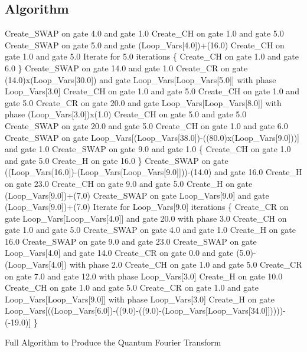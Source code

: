 \subsection{Algorithm}
\label{sec:evoqftalgo}
\begin{algorithm}
 \begin{algorithmic}
\STATE Create\_SWAP on gate 4.0 and gate 1.0
\STATE Create\_CH on gate 1.0 and gate 5.0
\STATE Create\_SWAP on gate 5.0 and gate (Loop\_Vars[4.0])+(16.0)
\STATE Create\_CH on gate 1.0 and gate 5.0
\STATE Iterate for 5.0 iterations \{
\STATE Create\_CH on gate 1.0 and gate 6.0
\STATE \}
\STATE Create\_SWAP on gate 14.0 and gate 1.0
\STATE Create\_CR on gate (14.0)x(Loop\_Vars[30.0]) and gate Loop\_Vars[Loop\_Vars[5.0]] with phase Loop\_Vars[3.0]
\STATE Create\_CH on gate 1.0 and gate 5.0
\STATE Create\_CH on gate 1.0 and gate 5.0
\STATE Create\_CR on gate 20.0 and gate Loop\_Vars[Loop\_Vars[8.0]] with phase (Loop\_Vars[3.0])x(1.0)
\STATE Create\_CH on gate 5.0 and gate 5.0
\STATE Create\_SWAP on gate 20.0 and gate 5.0
\STATE Create\_CH on gate 1.0 and gate 6.0
\STATE Create\_SWAP on gate Loop\_Vars[(Loop\_Vars[38.0])-((80.0)x(Loop\_Vars[9.0]))] and gate 1.0
\STATE Create\_SWAP on gate 9.0 and gate 1.0
\STATE \{
\STATE Create\_CH on gate 1.0 and gate 5.0
\STATE Create\_H on gate 16.0
\STATE \}
\STATE Create\_SWAP on gate ((Loop\_Vars[16.0])-(Loop\_Vars[Loop\_Vars[9.0]]))-(14.0) and gate 16.0
\STATE Create\_H on gate 23.0
\STATE Create\_CH on gate 9.0 and gate 5.0
\STATE Create\_H on gate (Loop\_Vars[9.0])+(7.0)
\STATE Create\_SWAP on gate Loop\_Vars[9.0] and gate (Loop\_Vars[9.0])+(7.0)
\STATE Iterate for Loop\_Vars[9.0] iterations \{
\STATE Create\_CR on gate Loop\_Vars[Loop\_Vars[4.0]] and gate 20.0 with phase 3.0
\STATE Create\_CH on gate 1.0 and gate 5.0
\STATE Create\_SWAP on gate 4.0 and gate 1.0
\STATE Create\_H on gate 16.0
\STATE Create\_SWAP on gate 9.0 and gate 23.0
\STATE Create\_SWAP on gate Loop\_Vars[4.0] and gate 14.0
\STATE Create\_CR on gate 0.0 and gate (5.0)-(Loop\_Vars[4.0]) with phase 2.0
\STATE Create\_CH on gate 1.0 and gate 5.0
\STATE Create\_CR on gate 7.0 and gate 12.0 with phase Loop\_Vars[3.0]
\STATE Create\_H on gate 10.0
\STATE Create\_CH on gate 1.0 and gate 5.0
\STATE Create\_CR on gate 1.0 and gate Loop\_Vars[Loop\_Vars[9.0]] with phase Loop\_Vars[3.0]
\STATE Create\_H on gate Loop\_Vars[((Loop\_Vars[6.0])-((9.0)-((9.0)-(Loop\_Vars[Loop\_Vars[34.0]]))))-(-19.0)]
\STATE \}
 \end{algorithmic}
\caption{Full Algorithm to Produce the Quantum Fourier Transform}
\label{alg:qftfullalg}
\end{algorithm}


